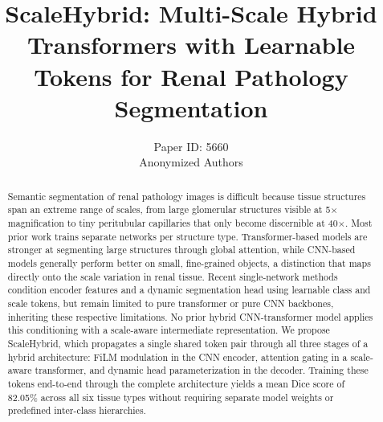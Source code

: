 \documentclass[runningheads]{llncs}
\begin{document}
%
\title{ScaleHybrid: Multi-Scale Hybrid Transformers with Learnable Tokens for Renal Pathology Segmentation}
%
%

\author{Paper ID: 5660 \\ Anonymized Authors}  %
%
\maketitle
%
\begin{abstract}
Semantic segmentation of renal pathology images is difficult because tissue structures span an extreme range of scales, from large glomerular structures visible at 5$\times$ magnification to tiny peritubular capillaries that only become discernible at 40$\times$. Most prior work trains separate networks per structure type. Transformer-based models are stronger at segmenting large structures through global attention, while CNN-based models generally perform better on small, fine-grained objects, a distinction that maps directly onto the scale variation in renal tissue. Recent single-network methods condition encoder features and a dynamic segmentation head using learnable class and scale tokens, but remain limited to pure transformer or pure CNN backbones, inheriting these respective limitations. No prior hybrid CNN-transformer model applies this conditioning with a scale-aware intermediate representation. We propose ScaleHybrid, which propagates a single shared token pair through all three stages of a hybrid architecture: FiLM modulation in the CNN encoder, attention gating in a scale-aware transformer, and dynamic head parameterization in the decoder. Training these tokens end-to-end through the complete architecture yields a mean Dice score of 82.05\% across all six tissue types without requiring separate model weights or predefined inter-class hierarchies.

\end{abstract}
%
%
\end{document}
